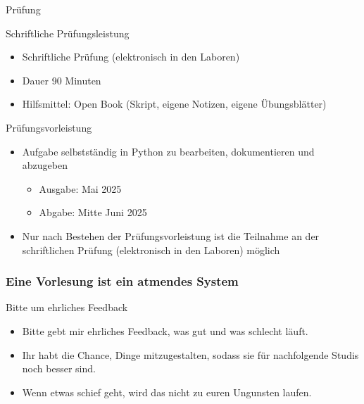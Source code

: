 \documentclass[xelatex,aspectratio=168]{beamer}
\begin{document}
\begin{frame}{Prüfung}
  \begin{block}{Schriftliche Prüfungsleistung}
    \begin{itemize}
      \item Schriftliche Prüfung (elektronisch in den Laboren)
      \item Dauer 90 Minuten
      \item Hilfsmittel: Open Book (Skript, eigene Notizen, eigene Übungsblätter)
    \end{itemize}
  \end{block}
  \begin{block}{Prüfungsvorleistung}
    \begin{itemize}
      \item Aufgabe selbstständig in Python zu bearbeiten, dokumentieren und abzugeben
            \begin{itemize}
              \item Ausgabe: Mai 2025
              \item Abgabe: Mitte Juni 2025
            \end{itemize}
      \item Nur nach Bestehen der Prüfungsvorleistung ist die Teilnahme an der schriftlichen Prüfung (elektronisch in den Laboren) möglich
    \end{itemize}
  \end{block}
\end{frame}

\begin{frame}
  \frametitle{Eine Vorlesung ist ein atmendes System}
  \begin{alertblock}{Bitte um ehrliches Feedback}
    \begin{itemize}
      \item Bitte gebt mir ehrliches Feedback, was gut und was schlecht läuft.
      \item Ihr habt die Chance, Dinge mitzugestalten, sodass sie für nachfolgende Studis noch besser sind. %
      \item Wenn etwas schief geht, wird das nicht zu euren Ungunsten laufen. %
    \end{itemize}
  \end{alertblock}
\end{frame}

\end{document}
